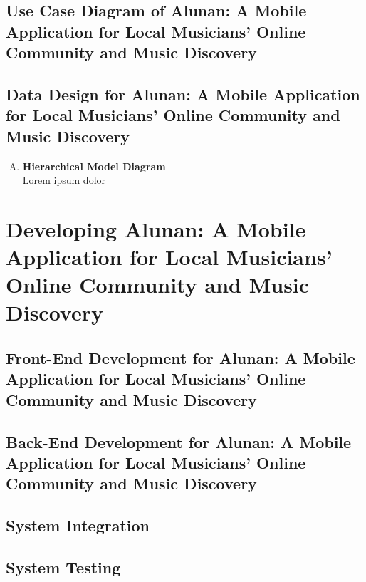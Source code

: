 \subsection{Use Case Diagram of Alunan: A Mobile Application for Local Musicians’ Online Community and Music Discovery}

\subsection{Data Design for Alunan: A Mobile Application for Local Musicians’ Online Community and Music Discovery}
\begin{enumerate}[A.]
    \item \textbf{Hierarchical Model Diagram} \\
    Lorem ipsum dolor
\end{enumerate}

\section{Developing Alunan: A Mobile Application for Local Musicians’ Online Community and Music Discovery}
\subsection{Front-End Development for Alunan: A Mobile Application for Local Musicians’ Online Community and Music Discovery}

\subsection{Back-End Development for Alunan: A Mobile Application for Local Musicians’ Online Community and Music Discovery}

\subsection{System Integration}

\subsection{System Testing}

